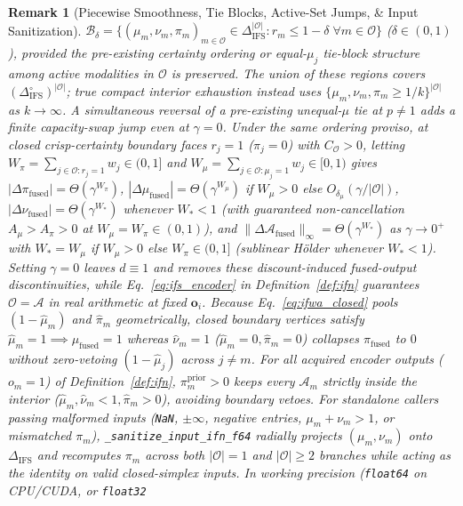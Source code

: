 \documentclass[10pt,twocolumn]{article}
\newtheorem{remark}{Remark}
\begin{document}
\begin{remark}[Piecewise Smoothness, Tie Blocks, Active-Set Jumps, \& Input Sanitization]
$\mathcal{B}_\delta = \{(\mu_m,\nu_m,\pi_m)_{m\in\mathcal{O}} \in
\Delta_{\text{IFS}}^{|\mathcal{O}|} : r_m \le 1-\delta\;\forall m\in\mathcal{O}\}$
($\delta\in(0,1)$), provided the pre-existing certainty ordering or equal-$\mu_j$ tie-block
structure among active modalities in $\mathcal{O}$ is preserved. The union of these regions
covers $(\Delta_{\text{IFS}}^\circ)^{|\mathcal{O}|}$; true compact interior exhaustion instead
uses $\{\mu_m,\nu_m,\pi_m \ge 1/k\}^{|\mathcal{O}|}$ as $k\to\infty$. A simultaneous reversal
of a pre-existing unequal-$\mu$ tie at $p\ne1$ adds a
finite capacity-swap jump even at $\gamma=0$. Under the same ordering proviso, at closed
crisp-certainty boundary faces $r_j=1$ ($\pi_j=0$) with
$C_{\mathcal{O}} > 0$, letting $W_\pi = \sum_{j \in \mathcal{O}: r_j=1} w_j \in (0, 1]$ and
$W_\mu = \sum_{j \in \mathcal{O}: \mu_j=1} w_j \in [0, 1)$ gives $|\Delta \pi_{\text{fused}}| =
\Theta(\gamma^{W_\pi})$, $|\Delta \mu_{\text{fused}}| = \Theta(\gamma^{W_\mu})$ if $W_\mu > 0$
else $O_{\delta_\mu}(\gamma/|\mathcal{O}|)$, $|\Delta \nu_{\text{fused}}| =
\Theta(\gamma^{W_*})$ whenever $W_* < 1$ (with guaranteed non-cancellation $A_\mu > A_\pi > 0$
at $W_\mu = W_\pi \in (0, 1)$), and $\|\Delta \mathcal{A}_{\text{fused}}\|_\infty =
\Theta(\gamma^{W_*})$ as $\gamma \to 0^+$ with $W_* = W_\mu$ if $W_\mu > 0$ else $W_\pi \in (0,
1]$ (sublinear Hölder whenever $W_* < 1$). Setting $\gamma=0$ leaves $d \equiv 1$ and removes
these discount-induced fused-output discontinuities, while Eq.~\eqref{eq:ifs_encoder} in
Definition~\ref{def:ifn} guarantees $\mathcal{O}=\mathcal{A}$ in real arithmetic at fixed
$\bm{o}_i$. Because Eq.~\eqref{eq:ifwa_closed} pools $(1-\hat{\mu}_m)$ and $\hat{\pi}_m$
geometrically, closed boundary vertices satisfy $\hat{\mu}_m = 1 \implies \mu_{\text{fused}}=1$
whereas $\hat{\nu}_m = 1$ ($\hat{\mu}_m=0,\hat{\pi}_m=0$) collapses $\pi_{\text{fused}}$ to $0$
without zero-vetoing $(1-\hat{\mu}_j)$ across $j \neq m$. For all acquired encoder outputs
($o_m=1$) of
Definition~\ref{def:ifn}, $\pi_m^{\text{prior}} > 0$ keeps every $\mathcal{A}_m$ strictly
inside the interior ($\hat{\mu}_m, \hat{\nu}_m < 1, \hat{\pi}_m > 0$), avoiding boundary
vetoes. For standalone callers passing malformed inputs (\texttt{NaN}, $\pm\infty$, negative
entries, $\mu_m+\nu_m>1$, or mismatched $\pi_m$), \texttt{\_sanitize\_input\_ifn\_f64} radially
projects $(\mu_m,\nu_m)$ onto $\Delta_{\text{IFS}}$ and recomputes $\pi_m$ across both
$|\mathcal{O}|=1$ and $|\mathcal{O}|\ge 2$ branches while acting as the identity on valid
closed-simplex inputs. In working precision (\texttt{float64} on CPU/CUDA, or \texttt{float32}

\end{remark}
\end{document}
